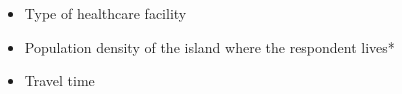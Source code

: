 \begin{itemize}
    \item Type of healthcare facility
    \item Population density of the island where the respondent lives*
    \item Travel time
\end{itemize}